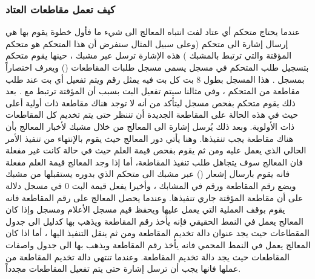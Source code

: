 \documentclass[document.tex]{subfiles}
\begin{document}
\subsubsection{كيف تعمل مقاطعات العتاد}
عندما يحتاج متحكم أي عتاد لفت انتباه المعالج الى شيء ما فأول خطوة يقوم بها هي إرسال إشارة الى متحكم  (وعلى سبيل المثال سنفرض أن هذا المتحكم هو متحكم المؤقتة  والتي ترتبط بالمشبك ) هذه الإشارة ترسل عبر مشبك  ، حينها يقوم متحكم  بتسجيل طلب المتحكم  في مسجل يسمى مسجل طلبات المقاطعات () ويعرف اختصاراً بمسجل  . هذا المسجل بطول 8 بت كل بت فيه يمثل رقم  ويتم تفعيل أي بت عند طلب مقاطعة من المتحكم ، وفي مثالنا سيتم تفعيل البت  بسبب أن المؤقتة ترتبط مع . بعد ذلك يقوم متحكم  بفحص مسجل  ليتأكد من أنه لا توجد هناك مقاطعة ذات أولية أعلى حيث في هذه الحالة على المقاطعة الجديدة أن تننظر حتى يتم تخديم كل المقاطعات ذات الأولوية. وبعد ذلك يُرسل  إشارة الى المعالج من خلال مشبك  لأخبار المعالج بأن هناك مقاطعة يجب تنفيذها. وهنا يأتي دور المعالج حيث يقوم بالإنتهاء من تنفيذ الأمر الحالي الذي يعمل عليه ومن ثم يقوم بفحص قيمة العلم  حيث في حالة كانت غير مفعلة فان المعالج سوف يتجاهل طلب تنفيذ المقاطعة، أما إذا وجد المعالج قيمة العلم مفعلة فانه يقوم بارسال إشعار () عبر مشبك  الى متحكم  الذي بدوره يستقبلها من مشبك  ويضع رقم المقاطعة ورقم  في المشابك  ، وأخيرا يفعل قيمة البت 0 في مسجل  دلالة على أن مقاطعة المؤقتة جاري تنفيذها. وعندما يحصل المعالج على رقم المقاطعة فانه يقوم بوقف العملية التي يعمل عليها ويحفظ قيم مسجل الأعلام ومسجل  وإذا كان المعالج يعمل في النمط الحقيقي فإنه يأخذ رقم المقاطعة ويذهب بها كدليل الى جدول المقطاعات  حيث يجد عنوان دالة تخديم المقاطعة ومن ثم ينقل التنفيذ اليها ، أما اذا كان المعالج يعمل في النمط المحمي فانه يأخذ رقم المقاطعة ويذهب بها الى جدول واصفات المقاطعات حيث يجد دالة تخديم المقاطعة. وعندما تنتهي دالة تخديم المقاطعة من عملها فانها يجب أن ترسل إشارة  حتى يتم تفعيل المقاطعات مجدداً.
\end{document}
